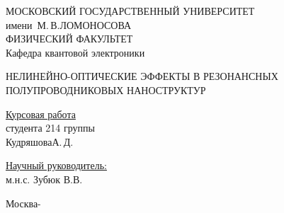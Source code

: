 \begin{titlepage}

\begin{center}
\large
МОСКОВСКИЙ ГОСУДАРСТВЕННЫЙ УНИВЕРСИТЕТ\\
имени~М.\,В.\;ЛОМОНОСОВА\\
ФИЗИЧЕСКИЙ ФАКУЛЬТЕТ\\
Кафедра квантовой электроники
\end{center}

\vfill

\begin{center}
\large
НЕЛИНЕЙНО-ОПТИЧЕСКИЕ ЭФФЕКТЫ В РЕЗОНАНСНЫХ ПОЛУПРОВОДНИКОВЫХ НАНОСТРУКТУР
\end{center}

\vfill

\begin{flushright}
    \begin{minipage}{0.35\textwidth}
    \underline{Курсовая работа}\\
    студента 214 группы\\
    Кудряшова\;А.\,Д.
    \end{minipage}
\end{flushright}
\vspace*{6mm}
\begin{flushright}
    \begin{minipage}{0.35\textwidth}
    \underline{Научный руководитель:}\\
    м.н.с. Зубюк В.В.\\
    \end{minipage}
\end{flushright}

\vfill

\centerline{Москва\;-}

\end{titlepage}